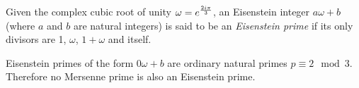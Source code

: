 \documentclass[12pt]{article}
\begin{document}
Given the complex cubic root of unity $\omega = e^{{2i\pi}\over{3}}$, an Eisenstein integer $a\omega + b$ (where $a$ and $b$ are natural integers) is said to be an \emph{Eisenstein prime} if its only divisors are 1, $\omega$, $1 + \omega$ and itself.

Eisenstein primes of the form $0\omega + b$ are ordinary natural primes $p \equiv 2 \mod 3$. Therefore no Mersenne prime is also an Eisenstein prime.
\end{document}
